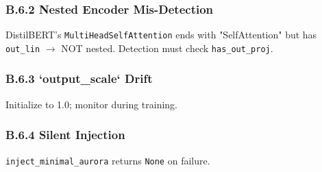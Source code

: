 \subsubsection{B.6.2 Nested Encoder Mis-Detection}

DistilBERT's \texttt{MultiHeadSelfAttention} ends with "SelfAttention" but has 
\texttt{out\_lin} $\to$ NOT nested. Detection must check \texttt{has\_out\_proj}.

\subsubsection{B.6.3 `output\_scale` Drift}

Initialize to 1.0; monitor during training.

\subsubsection{B.6.4 Silent Injection}

\texttt{inject\_minimal\_aurora} returns \texttt{None} on failure.

